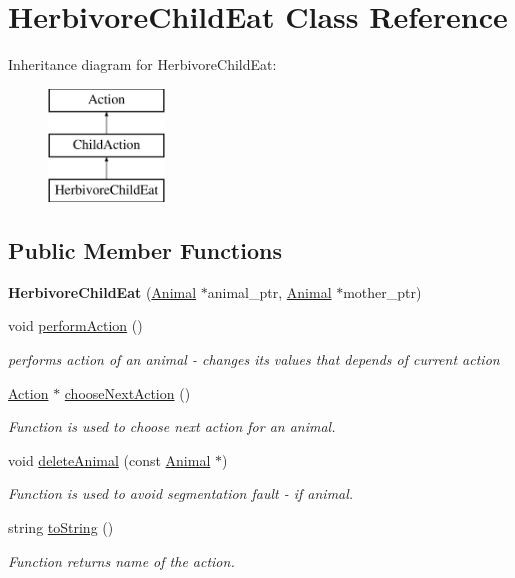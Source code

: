 \hypertarget{class_herbivore_child_eat}{}\section{Herbivore\+Child\+Eat Class Reference}
\label{class_herbivore_child_eat}
Inheritance diagram for Herbivore\+Child\+Eat\+:\begin{figure}[H]
\begin{center}
\leavevmode
\includegraphics[height=3.000000cm]{class_herbivore_child_eat}
\end{center}
\end{figure}
\subsection*{Public Member Functions}
\begin{DoxyCompactItemize}
\item 
\hypertarget{class_herbivore_child_eat_aa672db4e7c4e5a84e643f8393bd0d563}{}{\bfseries Herbivore\+Child\+Eat} (\hyperlink{class_animal}{Animal} $\ast$animal\+\_\+ptr, \hyperlink{class_animal}{Animal} $\ast$mother\+\_\+ptr)\label{class_herbivore_child_eat_aa672db4e7c4e5a84e643f8393bd0d563}

\item 
void \hyperlink{class_herbivore_child_eat_ab587b1aacdfbf5301d516d189352176f}{perform\+Action} ()
\begin{DoxyCompactList}\small\item\em performs action of an animal -\/ changes it\textquotesingle{}s values that depends of current action \end{DoxyCompactList}\item 
\hyperlink{class_action}{Action} $\ast$ \hyperlink{class_herbivore_child_eat_ae5349588055015e12ce6c384937b4354}{choose\+Next\+Action} ()
\begin{DoxyCompactList}\small\item\em Function is used to choose next action for an animal. \end{DoxyCompactList}\item 
void \hyperlink{class_herbivore_child_eat_adbe55d5ca2279f1b45d7816368f9a84d}{delete\+Animal} (const \hyperlink{class_animal}{Animal} $\ast$)
\begin{DoxyCompactList}\small\item\em Function is used to avoid segmentation fault -\/ if animal. \end{DoxyCompactList}\item 
string \hyperlink{class_herbivore_child_eat_a2ec22a4f5f382612e478e198fc8347ff}{to\+String} ()
\begin{DoxyCompactList}\small\item\em Function returns name of the action. \end{DoxyCompactList}\end{DoxyCompactItemize}
